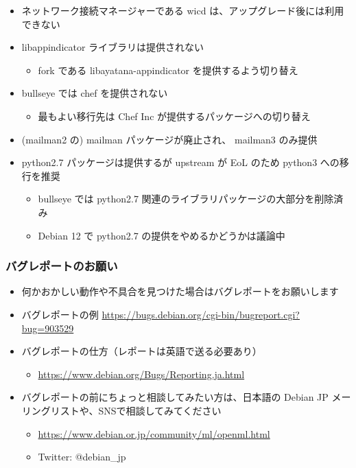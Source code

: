 \documentclass[mingoth,a4paper]{jsarticle}
\begin{document}
\begin{itemize}
\item ネットワーク接続マネージャーである wicd は、アップグレード後には利用できない
\item libappindicator ライブラリは提供されない
  \begin{itemize}
  \item fork である libayatana-appindicator を提供するよう切り替え
  \end{itemize}  
\item bullseye では chef を提供されない
  \begin{itemize}
  \item 最もよい移行先は Chef Inc が提供するパッケージへの切り替え
  \end{itemize}
\item (mailman2 の) mailman パッケージが廃止され、 mailman3 のみ提供
\item python2.7 パッケージは提供するが upstream が EoL のため python3 への移行を推奨
  \begin{itemize}
  \item bullseye では python2.7 関連のライブラリパッケージの大部分を削除済み
  \item Debian 12 で python2.7 の提供をやめるかどうかは議論中
  \end{itemize}
\end{itemize}



\subsubsection{バグレポートのお願い}

\begin{itemize}
\item 何かおかしい動作や不具合を見つけた場合はバグレポートをお願いします
\item バグレポートの例 \url{https://bugs.debian.org/cgi-bin/bugreport.cgi?bug=903529}
\item バグレポートの仕方（レポートは英語で送る必要あり）
  \begin{itemize}
  \item \url{https://www.debian.org/Bugs/Reporting.ja.html}
  \end{itemize}
\item バグレポートの前にちょっと相談してみたい方は、日本語の Debian JP メーリングリストや、SNSで相談してみてください
  \begin{itemize}
  \item \url{https://www.debian.or.jp/community/ml/openml.html}
  \item Twitter: @debian\_jp
  \end{itemize}
\end{itemize}
\end{document}
